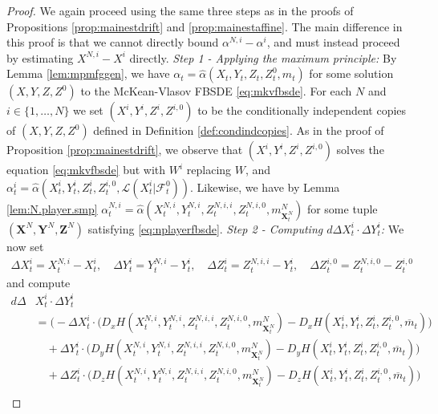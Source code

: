 \documentclass[11pt,reqno]{amsart}
\numberwithin{equation}{section}
\theoremstyle{definition}
\newcommand{\bX}{\mathbf{X}}
\newcommand{\bY}{\mathbf{Y}}
\newcommand{\bZ}{\mathbf{Z}}
\newcommand{\sL}{\mathcal{L}}
\newcommand{\sF}{\mathcal{F}}
\newcommand{\ov}{\overline}
\begin{document}
\begin{proof}
We again proceed using the same three steps as in the proofs of Propositions \ref{prop:mainestdrift} and \ref{prop:mainestaffine}. The main difference in this proof is that we cannot directly bound $\alpha^{N,i} - \alpha^i$, and must instead proceed by estimating $X^{N,i} - X^i$ directly. 
\newline \newline \noindent
\textit{Step 1 - Applying the maximum principle:} By Lemma \ref{lem:mpmfggen}, we have $\alpha_t = \widehat{\alpha}(X_t,Y_t,Z_t,Z_t^0,m_t)$ for some solution $(X,Y,Z,Z^0)$ to the McKean-Vlasov FBSDE \eqref{eq:mkvfbsde}. For each $N$ and $i \in \{1,\dots,N\}$ we set $(X^i,Y^i, Z^i, Z^{i,0})$ to be the conditionally independent copies of $(X,Y,Z,Z^0)$ defined in Definition \ref{def:condindcopies}. As in the proof of Proposition \ref{prop:mainestdrift}, we observe that $(X^i,Y^i, Z^i, Z^{i,0})$ solves the equation \eqref{eq:mkvfbsde} but with $W^i$ replacing $W$, and $\alpha_t^i = \widehat{\alpha}(X_t^i, Y_t^i, Z_t^{i}, Z_t^{i,0}, \sL(X_t^i | \sF_t^0))$. Likewise, we have by Lemma \ref{lem:N.player.smp} $\alpha_t^{N,i} = \widehat{\alpha}(X_t^{N,i}, Y_t^{N,i}, Z_t^{N,i,i}, Z_t^{N,i,0}, m_{\bX_t^N}^N)$ for some tuple $(\bm X^N, \bY^N, \bZ^N)$ satisfying \eqref{eq:nplayerfbsde}. 
\newline \newline \noindent
\textit{Step 2 - Computing $d \Delta X_t^i \cdot \Delta Y_t^i$:} We now set 
\begin{align*}
\Delta X_t^i = X_t^{N,i} - X_t^i, \quad \Delta Y_t^i = Y_t^{N,i} - Y_t^i, \quad \Delta Z_t^i = Z_t^{N,i,i} - Y_t^i, \quad \Delta Z_t^{i,0} = Z_t^{N,i,0} - Z_t^{i,0}
\end{align*}
and compute 
\begin{align} \label{xycompcont}
d \Delta& X_t^i \cdot \Delta Y_t^i \nonumber  
\\
&=  \bigg( - \Delta X_t^i\cdot\Big( D_x H (X_t^{N,i},Y_t^{N,i},Z_t^{N,i,i},Z_t^{N,i,0}, m_{\bX_t^N}^N) - D_x H(X_t^i,Y_t^i,Z_t^i,Z_t^{i,0}, \ov{m}_t) \bigg)  \nonumber \\
&\quad + \Delta Y_t^i\cdot\Big(D_y H (X_t^{N,i},Y_t^{N,i},Z_t^{N,i,i},Z_t^{N,i,0}, m_{\bX_t^N}^N) - D_y H(X_t^i,Y_t^i,Z_t^i,Z_t^{i,0}, \ov{m}_t) \Big)  \nonumber \\ 
&\quad +  \Delta Z_t^{i}\cdot \Big(D_z H (X_t^{N,i},Y_t^{N,i},Z_t^{N,i,i},Z_t^{N,i,0}, m_{\bX_t^N}^N) - D_z H(X_t^i,Y_t^i,Z_t^i,Z_t^{i,0}, \ov{m}_t) \Big)  \nonumber \\ 

\end{align}
\end{proof}
\end{document}
